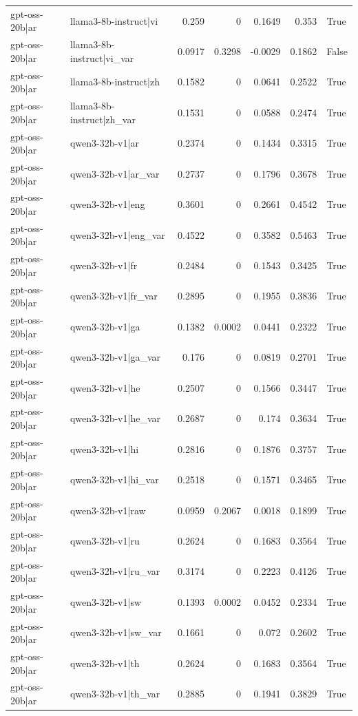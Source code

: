 \begin{table}
\begin{tabular}{l l r r r r l}
gpt-oss-20b|ar & llama3-8b-instruct|vi & 0.259 & 0 & 0.1649 & 0.353 & True \\
gpt-oss-20b|ar & llama3-8b-instruct|vi_var & 0.0917 & 0.3298 & -0.0029 & 0.1862 & False \\
gpt-oss-20b|ar & llama3-8b-instruct|zh & 0.1582 & 0 & 0.0641 & 0.2522 & True \\
gpt-oss-20b|ar & llama3-8b-instruct|zh_var & 0.1531 & 0 & 0.0588 & 0.2474 & True \\
gpt-oss-20b|ar & qwen3-32b-v1|ar & 0.2374 & 0 & 0.1434 & 0.3315 & True \\
gpt-oss-20b|ar & qwen3-32b-v1|ar_var & 0.2737 & 0 & 0.1796 & 0.3678 & True \\
gpt-oss-20b|ar & qwen3-32b-v1|eng & 0.3601 & 0 & 0.2661 & 0.4542 & True \\
gpt-oss-20b|ar & qwen3-32b-v1|eng_var & 0.4522 & 0 & 0.3582 & 0.5463 & True \\
gpt-oss-20b|ar & qwen3-32b-v1|fr & 0.2484 & 0 & 0.1543 & 0.3425 & True \\
gpt-oss-20b|ar & qwen3-32b-v1|fr_var & 0.2895 & 0 & 0.1955 & 0.3836 & True \\
gpt-oss-20b|ar & qwen3-32b-v1|ga & 0.1382 & 0.0002 & 0.0441 & 0.2322 & True \\
gpt-oss-20b|ar & qwen3-32b-v1|ga_var & 0.176 & 0 & 0.0819 & 0.2701 & True \\
gpt-oss-20b|ar & qwen3-32b-v1|he & 0.2507 & 0 & 0.1566 & 0.3447 & True \\
gpt-oss-20b|ar & qwen3-32b-v1|he_var & 0.2687 & 0 & 0.174 & 0.3634 & True \\
gpt-oss-20b|ar & qwen3-32b-v1|hi & 0.2816 & 0 & 0.1876 & 0.3757 & True \\
gpt-oss-20b|ar & qwen3-32b-v1|hi_var & 0.2518 & 0 & 0.1571 & 0.3465 & True \\
gpt-oss-20b|ar & qwen3-32b-v1|raw & 0.0959 & 0.2067 & 0.0018 & 0.1899 & True \\
gpt-oss-20b|ar & qwen3-32b-v1|ru & 0.2624 & 0 & 0.1683 & 0.3564 & True \\
gpt-oss-20b|ar & qwen3-32b-v1|ru_var & 0.3174 & 0 & 0.2223 & 0.4126 & True \\
gpt-oss-20b|ar & qwen3-32b-v1|sw & 0.1393 & 0.0002 & 0.0452 & 0.2334 & True \\
gpt-oss-20b|ar & qwen3-32b-v1|sw_var & 0.1661 & 0 & 0.072 & 0.2602 & True \\
gpt-oss-20b|ar & qwen3-32b-v1|th & 0.2624 & 0 & 0.1683 & 0.3564 & True \\
gpt-oss-20b|ar & qwen3-32b-v1|th_var & 0.2885 & 0 & 0.1941 & 0.3829 & True \\

\end{tabular}
\end{table}
